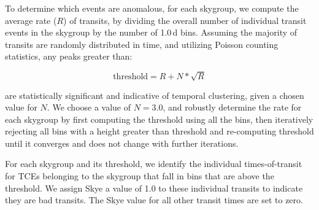 To determine which events are anomalous, for each skygroup, we compute the average rate ($R$) of transits, by dividing the overall number of individual transit events in the skygroup by the number of 1.0\,d bins. Assuming the majority of transits are randomly distributed in time, and utilizing Poisson counting statistics, any peaks greater than:

\begin{equation}
\label{eq:skye}
\mathrm{threshold} = R + N*\sqrt{R}
\end{equation}

\noindent are statistically significant and indicative of temporal clustering, given a chosen value for $N$. We choose a value of $N = 3.0$, and robustly determine the rate for each skygroup by first computing the threshold using all the bins, then iteratively rejecting all bins with a height greater than threshold and re-computing threshold until it converges and does not change with further iterations.

For each skygroup and its threshold, we identify the individual times-of-transit for TCEs belonging to the skygroup that fall in bins that are above the threshold. We assign Skye a value of 1.0 to these individual transits to indicate they are bad transits. The Skye value for all other transit times are set to zero.


